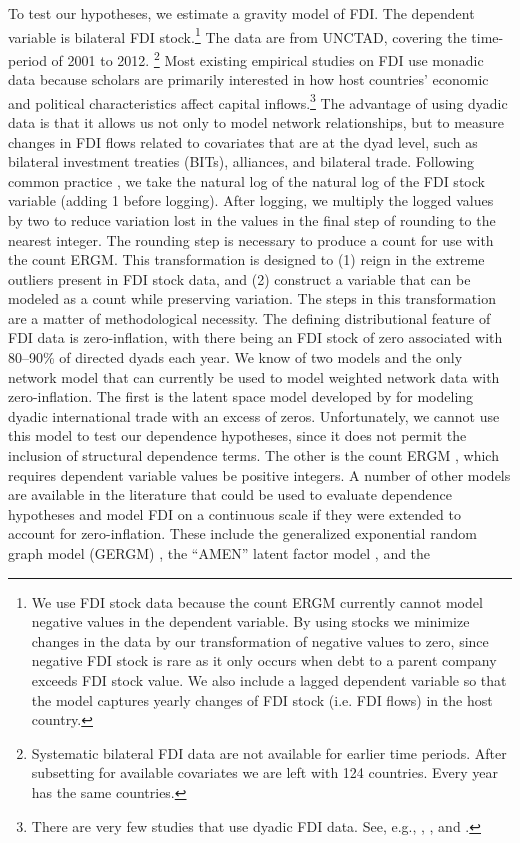\documentclass[reqno,onecolumn,letterpaper,12pt]{article}
\begin{document}
To test our hypotheses, we estimate a gravity model of FDI. %
The dependent variable is bilateral FDI stock.\footnote{ We use FDI stock data because the count ERGM currently cannot model negative values in the dependent variable. By using stocks we minimize changes in the data by our transformation of negative values to zero, since negative FDI stock is rare as it only occurs when debt to a parent company exceeds FDI stock value. We also include a lagged dependent variable so that the model captures yearly changes of FDI stock (i.e. FDI flows) in the host country.} The data are from UNCTAD, covering the time-period of 2001 to 2012.%
\footnote{Systematic bilateral FDI data are not available for earlier time periods. After subsetting for available covariates we are left with 124 countries. Every year has the same countries.} Most existing empirical studies on FDI use monadic data because scholars are primarily interested in how host countries' economic and political characteristics affect capital inflows.\footnote{There are very few studies that use dyadic FDI data. See, e.g.,  \citet{Leblang:2010}, \citet{Li_Vashchilko:2010}, and \citet{Razin_et_al:2005}. } The advantage of using dyadic data is that it allows us not only to model network relationships, but to measure changes in FDI flows related to covariates that are at the dyad level, such as bilateral investment treaties (BITs), alliances, and bilateral trade. Following common practice \citep[e.g.,][]{hyun2006quality,benassy2007institutional}, we take the natural log of the natural log of the FDI stock variable (adding 1 before logging). After logging, we multiply the logged values by two to reduce variation lost in the values in the final step of rounding to the nearest integer. The rounding step is necessary to produce a count for use with the count ERGM. This transformation is designed to (1) reign in the extreme outliers present in FDI stock data, and (2) construct a variable that can be modeled as a count while preserving variation. The steps in this transformation are a matter of methodological necessity.  The defining distributional feature of FDI data is zero-inflation, with there being an FDI stock of zero associated with 80--90\% of directed dyads each year. We know of two models and the only network model that can currently be used to model weighted network data with zero-inflation. The first is the latent space model developed by \cite{ward2013gravity} for modeling dyadic international trade with an excess of zeros. Unfortunately, we cannot use this model to test our dependence hypotheses, since it does not permit the inclusion of structural dependence terms. The other is the count ERGM \citep{krivitsky2012exponential}, which requires dependent variable values be positive integers. A number of other models are available in the literature that could be used to evaluate dependence hypotheses and model FDI on a continuous scale if they were extended to account for zero-inflation. These include the generalized exponential random graph model (GERGM) \citep{wilson2017stochastic},  the ``AMEN'' latent factor model \citep{minhas2019inferential}, and the 
\end{document}
